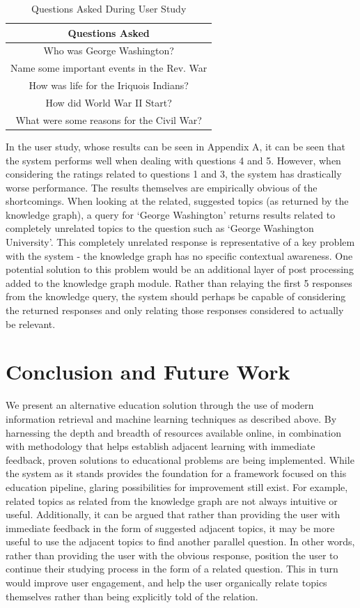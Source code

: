 \documentclass[11pt,a4paper]{article}
\begin{document}
\begin{table}[h!]
\centering
\begin{tabular}{c}
\hline \bf Questions Asked \\ \hline
Who was George Washington? \\
Name some important events in the Rev. War \\
How was life for the Iriquois Indians?\\
How did World War II Start? \\
What were some reasons for the Civil War? \\
\hline
\end{tabular}
\caption{\label{ques-table} Questions Asked During User Study}
\end{table}

In the user study, whose results can be seen in Appendix A, it can be seen that the system performs well when dealing with questions 4 and 5. However, when considering the ratings related to questions 1 and 3, the system has drastically worse performance. The results themselves are empirically obvious of the shortcomings. When looking at the related, suggested topics (as returned by the knowledge graph), a query for ‘George Washington’ returns results related to completely unrelated topics to the question such as ‘George Washington University’. This completely unrelated response is representative of a key problem with the system - the knowledge graph has no specific contextual awareness. One potential solution to this problem would be an additional layer of post processing added to the knowledge graph module. Rather than relaying the first 5 responses from the knowledge query, the system should perhaps be capable of considering the returned responses and only relating those responses considered to actually be relevant. 

\section{Conclusion and Future Work}

We present an alternative education solution through the use of modern information retrieval and machine learning techniques as described above. By harnessing the depth and breadth of resources available online, in combination with methodology that helps establish adjacent learning with immediate feedback, proven solutions to educational problems are being implemented. While the system as it stands provides the foundation for a framework focused on this education pipeline, glaring possibilities for improvement still exist. For example, related topics as related from the knowledge graph are not always intuitive or useful. Additionally, it can be argued that rather than providing the user with immediate feedback in the form of suggested adjacent topics, it may be more useful to use the adjacent topics to find another parallel question. In other words, rather than providing the user with the obvious response, position the user to continue their studying process in the form of a related question. This in turn would improve user engagement, and help the user organically relate topics themselves rather than being explicitly told of the relation.
\end{document}
